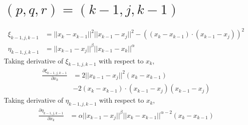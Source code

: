 \documentclass[a4paper]{article}
\newcommand{\norm}[1]{||#1||}
\begin{document}
\section{$(p,q,r) = (k-1, j, k-1)$}
\begin{align}
    \xi_{k-1,j,k-1} &= \norm{x_k - x_{k-1}}^2 \norm{x_{k-1} - x_j}^2- \left( \left( x_k - x_{k-1} \right) \cdot \left( x_{k-1} - x_{j} \right) \right)^2 \\
    \eta_{k-1,j,k-1} &= \norm{x_{k-1} - x_j}^{\beta} \norm{x_{k-1} - x_k}^{\alpha}
\end{align}
Taking derivative of $\xi_{k-1, j, k-1}$ with respect to $x_k$,
\begin{align}
    \frac{\partial \xi_{k-1, j, k-1}}{\partial x_k} &= 2 \norm{x_{k-1} - x_j}^2 \left( x_k - x_{k-1} \right) \\
    &- 2 \left( x_k - x_{k-1} \right) \cdot \left( x_{k-1} - x_j \right) \left( x_{k-1} - x_j \right)
\end{align}
Taking derivative of $\eta_{k-1, j, k-1}$ with respect to $x_k$,
\begin{align}
    \frac{\partial \eta_{k-1, j, k-1}}{\partial x_k} &= \alpha \norm{x_{k-1} - x_j}^{\beta} \norm{x_k - x_{k-1}}^{\alpha-2} \left( x_k - x_{k-1} \right)
\end{align}
\end{document}
